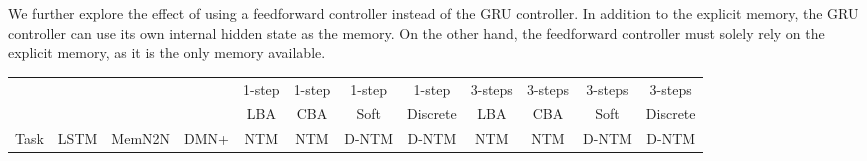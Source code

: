 \documentclass[12pt]{article}
\begin{document}
We further explore the effect of using a feedforward controller instead of the GRU controller. In addition to the explicit memory, the GRU controller can use its own internal hidden state as the memory. On the other hand, the feedforward controller must solely rely on the explicit memory, as it is the only memory available.


\begin{table*}[htbp]
\vspace{-2mm}
  \centering
  \tiny 
\begin{tabular}{ | l || c | c | c || c |c |c|c|| c | c | c|c| }
\hline
& & & & 1-step & 1-step & 1-step & 1-step & 3-steps & 3-steps & 3-steps & 3-steps \\ 
& & & & LBA & CBA & Soft & Discrete & LBA & CBA & Soft & Discrete\\
Task & LSTM & MemN2N & DMN+ & NTM & NTM & D-NTM & D-NTM  & NTM & NTM & D-NTM & D-NTM \\ \hline


\end{tabular}
\end{table*}
\end{document}
